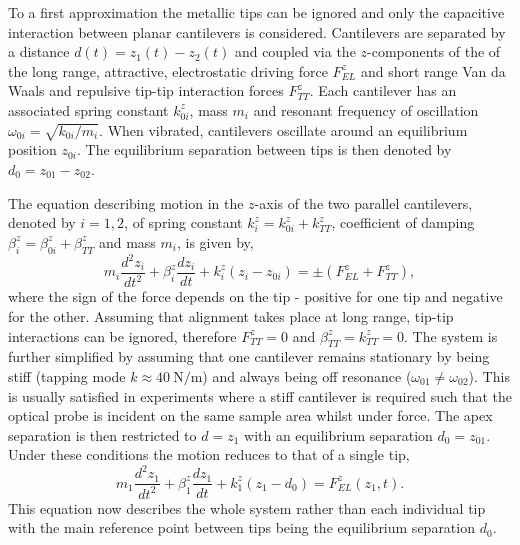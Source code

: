 \documentclass{article}
\begin{document}
To a first approximation the metallic tips can be ignored and only the capacitive interaction between planar cantilevers is considered. Cantilevers are separated by a distance $d(t) = z_1(t) - z_2(t)$ and coupled via the $z$-components of the of the long range, attractive, electrostatic driving force $F_{EL}^z$ and short range  Van da Waals and repulsive tip-tip interaction forces $F_{TT}^z$. Each cantilever has an associated spring constant $k_{0i}^z$, mass $m_i$ and resonant frequency of oscillation $\omega_{0i} = \sqrt{k_{0i}/m_i}$. When vibrated, cantilevers oscillate around an equilibrium position $z_{0i}$. The equilibrium separation between tips is then denoted by $d_0 = z_{01} - z_{02}$.

The equation describing motion in the $z$-axis of the two parallel cantilevers, denoted by $i=1,2$, of spring constant $k_i^z=k_{0i}^z+k_{TT}^z$, coefficient of damping $\beta_i^z=\beta_{0i}^z+\beta_{TT}^z$ and mass $m_i$, is given by,
\begin{equation}
	m_i\frac{d^2z_i}{dt^2}+\beta_i^z\frac{dz_i}{dt}+k_i^z\left(z_i-z_{0i}\right)=\pm\left(F_{EL}^z+F_{TT}^z\right),
\end{equation}
where the sign of the force depends on the tip - positive for one tip and negative for the other.
Assuming that alignment takes place at long range, tip-tip interactions can be ignored, therefore $F_{TT}^z = 0$ and $\beta_{TT}^{z} = k_{TT}^{z} = 0$. The system is further simplified by assuming that one cantilever remains stationary by being stiff (tapping mode $k\approx\SI{40}{\newton\per\metre}$) and always being off resonance ($\omega_{01} \neq \omega_{02}$). This is usually satisfied in experiments where a stiff cantilever is required such that the optical probe is incident on the same sample area whilst under force. The apex separation is then restricted to $d=z_1$ with an equilibrium separation $d_0 = z_{01}$. Under these conditions the motion reduces to that of a single tip,
\begin{equation}
	m_1\frac{d^2z_1}{dt^2}+\beta_1^z\frac{dz_1}{dt}+k_1^z\left(z_1-d_0\right) = F_{EL}^z(z_1, t).
	\label{eq:simple_eom}
\end{equation}
This equation now describes the whole system rather than each individual tip with the main reference point between tips being the equilibrium separation $d_0$.
\end{document}
